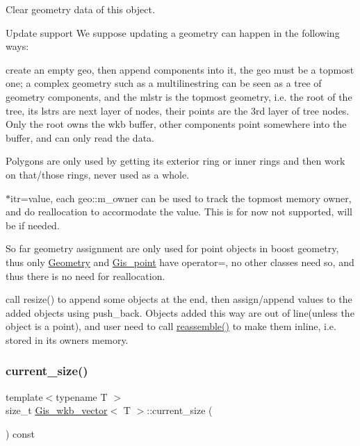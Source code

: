 Clear geometry data of this object. 

Update support We suppose updating a geometry can happen in the following ways\+:
\begin{DoxyEnumerate}
\item create an empty geo, then append components into it, the geo must be a topmost one; a complex geometry such as a multilinestring can be seen as a tree of geometry components, and the mlstr is the topmost geometry, i.\+e. the root of the tree, its lstrs are next layer of nodes, their points are the 3rd layer of tree nodes. Only the root owns the wkb buffer, other components point somewhere into the buffer, and can only read the data.

Polygons are only used by getting its exterior ring or inner rings and then work on that/those rings, never used as a whole.
\item $\ast$itr=value, each geo\+::m\+\_\+owner can be used to track the topmost memory owner, and do reallocation to accormodate the value. This is for now not supported, will be if needed.

So far geometry assignment are only used for point objects in boost geometry, thus only \mbox{\hyperlink{classGeometry}{Geometry}} and \mbox{\hyperlink{classGis__point}{Gis\+\_\+point}} have operator=, no other classes need so, and thus there is no need for reallocation.
\item call resize() to append some objects at the end, then assign/append values to the added objects using push\+\_\+back. Objects added this way are out of line(unless the object is a point), and user need to call \mbox{\hyperlink{classGis__wkb__vector_a570dda402fe9aef5438098fe5714086c}{reassemble()}} to make them inline, i.\+e. stored in its owner\textquotesingle{}s memory. 
\end{DoxyEnumerate}\mbox{\label{classGis__wkb__vector_a740c7d54f53fb0e4da20f63b5211d9a2}} 
\subsubsection{\texorpdfstring{current\+\_\+size()}{current\_size()}}
{\footnotesize\ttfamily template$<$typename T $>$ \\
size\+\_\+t \mbox{\hyperlink{classGis__wkb__vector}{Gis\+\_\+wkb\+\_\+vector}}$<$ T $>$\+::current\+\_\+size (\begin{DoxyParamCaption}{ }\end{DoxyParamCaption}) const}


